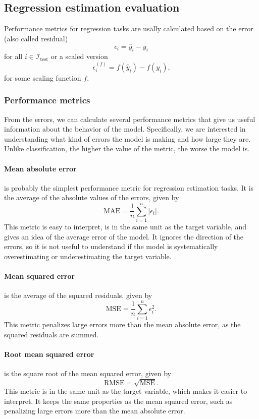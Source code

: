 \subsection{Regression estimation evaluation}

Performance metrics for regression tasks are usally calculated based on the error (also
called residual) $$\epsilon_i = \hat{y}_i - y_i$$ for all $i \in \mathcal{I}_\text{test}$ or
a scaled version $$\epsilon_i^{(f)} = f(\hat{y}_i) - f(y_i)\text{,}$$ for some scaling
function $f$.

\subsubsection{Performance metrics}

From the errors, we can calculate several performance metrics that give us useful
information about the behavior of the model.  Specifically, we are interested in
understanding what kind of errors the model is making and how large they are.  Unlike
classification, the higher the value of the metric, the worse the model is.

\paragraph{Mean absolute error} is probably the simplest performance metric for regression
estimation tasks.  It is the average of the absolute values of the errors,
given by
\begin{equation*}
  \text{MAE} = \frac{1}{n} \sum_{i=1}^n | \epsilon_i |\text{.}
\end{equation*}
This metric is easy to interpret, is in the same unit as the target variable, and gives an
idea of the average error of the model.  It ignores the direction of the errors, so it is
not useful to understand if the model is systematically overestimating or underestimating
the target variable.

\paragraph{Mean squared error} is the average of the squared residuals, given by
\begin{equation*}
  \text{MSE} = \frac{1}{n} \sum_{i=1}^n \epsilon_i^2\text{.}
\end{equation*}
This metric penalizes large errors more than the mean absolute error, as the squared
residuals are summed.

\paragraph{Root mean squared error} is the square root of the mean squared error, given by
\begin{equation*}
  \text{RMSE} = \sqrt{\text{MSE}}\text{.}
\end{equation*}
This metric is in the same unit as the target variable, which makes it easier to
interpret.  It keeps the same properties as the mean squared error, such as penalizing
large errors more than the mean absolute error.

